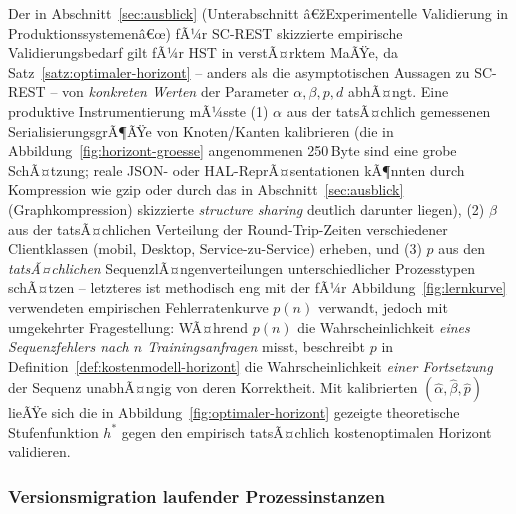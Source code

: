 ﻿\documentclass[a4paper,12pt]{article}
\theoremstyle{definition}
\begin{document}
Der in Abschnitt~\ref{sec:ausblick} (Unterabschnitt â€žExperimentelle Validierung in
Produktionssystemenâ€œ) fÃ¼r SC-REST skizzierte empirische Validierungsbedarf gilt fÃ¼r HST
in verstÃ¤rktem MaÃŸe, da Satz~\ref{satz:optimaler-horizont} -- anders als die
asymptotischen Aussagen zu SC-REST -- von \emph{konkreten Werten} der Parameter
$\alpha,\beta,p,d$ abhÃ¤ngt. Eine produktive Instrumentierung mÃ¼sste (1) $\alpha$ aus der
tatsÃ¤chlich gemessenen SerialisierungsgrÃ¶ÃŸe von Knoten/Kanten kalibrieren (die in
Abbildung~\ref{fig:horizont-groesse} angenommenen 250\,Byte sind eine grobe SchÃ¤tzung;
reale JSON- oder HAL-ReprÃ¤sentationen kÃ¶nnten durch Kompression wie gzip oder durch das
in Abschnitt~\ref{sec:ausblick} (Graphkompression) skizzierte \emph{structure sharing}
deutlich darunter liegen), (2) $\beta$ aus der tatsÃ¤chlichen Verteilung der
Round-Trip-Zeiten verschiedener Clientklassen (mobil, Desktop, Service-zu-Service)
erheben, und (3) $p$ aus den \emph{tatsÃ¤chlichen} SequenzlÃ¤ngenverteilungen
unterschiedlicher Prozesstypen schÃ¤tzen -- letzteres ist methodisch eng mit der fÃ¼r
Abbildung~\ref{fig:lernkurve} verwendeten empirischen Fehlerratenkurve $p(n)$ verwandt,
jedoch mit umgekehrter Fragestellung: WÃ¤hrend $p(n)$ die Wahrscheinlichkeit \emph{eines
Sequenzfehlers nach $n$ Trainingsanfragen} misst, beschreibt $p$ in
Definition~\ref{def:kostenmodell-horizont} die Wahrscheinlichkeit \emph{einer
Fortsetzung} der Sequenz unabhÃ¤ngig von deren Korrektheit. Mit kalibrierten
$(\hat\alpha,\hat\beta,\hat p)$ lieÃŸe sich die in
Abbildung~\ref{fig:optimaler-horizont} gezeigte theoretische Stufenfunktion $h^\ast$
gegen den empirisch tatsÃ¤chlich kostenoptimalen Horizont validieren.

\subsubsection{Versionsmigration laufender Prozessinstanzen}
\end{document}
